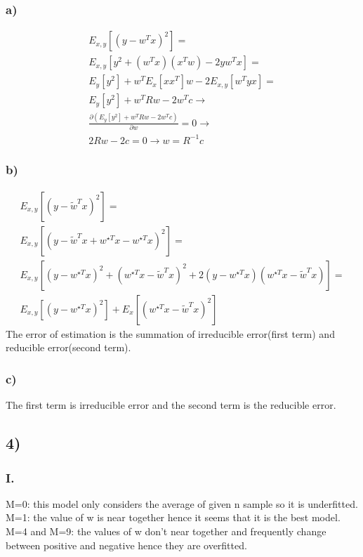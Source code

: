 \documentclass[12pt]{article}
\begin{document}
\subsubsection{a)}
 \begin{equation}
\begin{split}
 E_{x,y}\left[\left(y-w^{T}x\right)^2\right]=\\E_{x,y}\left[y^2+\left(w^{T}x\right)\left(x^{T}w\right)-2yw^{T}x\right]=\\E_{y}\left[y^2\right]+w^{T}E_x\left[xx^{T}\right]w-2E_{x,y}\left[w^{T}yx\right]=\\E_{y}\left[y^2\right]+w^{T}Rw-2w^{T}c \rightarrow\\ 
 \frac{\partial (E_{y}\left[y^2\right]+w^{T}Rw-2w^{T}c)}{\partial w}=0 \rightarrow \\
 2Rw-2c=0 \rightarrow w= R^{-1}c 
 \end{split}
 \end{equation}
 \subsubsection{b)}
 \begin{equation*}
 \begin{split}
 E_{x,y}\left[\left(y-\tilde{w}^{T}x\right)^2\right]= \\E_{x,y}\left[\left(y-\tilde{w}^{T}x+w^{\star T}x-w^{\star T}x\right)^{2}\right]=\\ E_{x,y}\left[\left(y-w^{\star T}x\right)^2+\left(w^{\star T}x-\tilde{w}^{T}x\right)^2+2\left(y-w^{\star T}x\right)\left(w^{\star T}x-\tilde{w}^{T}x\right) \right] =\\E_{x,y}\left[\left(y-w^{\star T}x\right)^2\right]+E_{x}\left[\left(w^{\star T}x-\tilde{w}^{T}x\right)^2\right]
 \end{split}
 \end{equation*}
The error of estimation is the summation of irreducible error(first term) and reducible error(second term).
\subsubsection{c)} 
The first term is irreducible error and the second term is the reducible error.
\subsection{4)}
\subsubsection{I.}
M=0: this model only considers the average of given n sample so it is underfitted.\\
M=1: the value of w is near together hence it seems that it is the best model.\\
M=4 and M=9: the values of w don't near together and frequently change between positive and negative hence they are overfitted.
\end{document}
